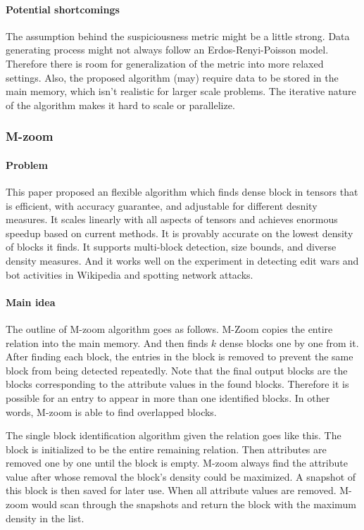 \paragraph{Potential shortcomings} The assumption behind the suspiciousness metric might be a little strong. Data generating process might not always follow an Erdos-Renyi-Poisson model. Therefore there is room for generalization of the metric into more relaxed settings. Also, the proposed algorithm (may) require data to be stored in the main memory, which isn't realistic for larger scale problems. The iterative nature of the algorithm makes it hard to scale or parallelize.


\subsubsection{M-zoom \cite{shin2016m} }

\paragraph{Problem}  This paper proposed an flexible algorithm which finds dense block in tensors that is efficient, with accuracy guarantee, and adjustable for different desnity measures. It scales linearly with all aspects of tensors and achieves enormous speedup based on current methods. It is provably accurate on the lowest density of blocks it finds. It supports multi-block detection, size bounds, and diverse density measures. And it works well on the experiment in detecting edit wars and bot activities in Wikipedia and spotting network attacks.

\paragraph{Main idea} 
The outline of M-zoom algorithm goes as follows. M-Zoom copies the entire relation into the main memory. And then finds $k$ dense blocks one by one from it. After finding each block, the entries in the block is removed to prevent the same block from being detected repeatedly. Note that the final output blocks are the blocks corresponding to the attribute values in the found blocks. Therefore it is possible for an entry to appear in more than one identified blocks. In other words, M-zoom is able to find overlapped blocks.

The single block identification algorithm given the relation goes like this. The block is initialized to be the entire remaining relation. Then attributes are removed one by one until the block is empty. M-zoom always find the attribute value after whose removal the block's density could be maximized. A snapshot of this block is then saved for later use. When all attribute values are removed. M-zoom would scan through the snapshots and return the block with the maximum density in the list.



